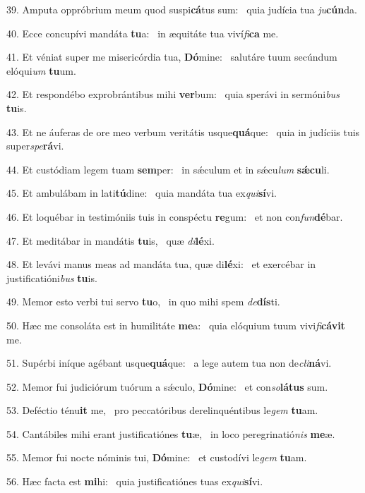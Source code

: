 39. Amputa oppróbrium meum quod suspi\textbf{cá}tus sum: \ast\  quia judícia tua \textit{ju}\textbf{cún}da.\

40. Ecce concupívi mandáta \textbf{tu}a: \ast\  in æquitáte tua viví\textit{fi}\textbf{ca} me.\

41. Et véniat super me misericórdia tua, \textbf{Dó}mine: \ast\  salutáre tuum secúndum elóqui\textit{um} \textbf{tu}um.\

42. Et respondébo exprobrántibus mihi \textbf{ver}bum: \ast\  quia sperávi in sermóni\textit{bus} \textbf{tu}is.\

43. Et ne áuferas de ore meo verbum veritátis usque\textbf{quá}que: \ast\  quia in judíciis tuis super\textit{spe}\textbf{rá}vi.\

44. Et custódiam legem tuam \textbf{sem}per: \ast\  in sǽculum et in sǽcu\textit{lum} \textbf{sǽ}\textbf{cu}li.\

45. Et ambulábam in lati\textbf{tú}dine: \ast\  quia mandáta tua ex\textit{qui}\textbf{sí}vi.\

46. Et loquébar in testimóniis tuis in conspéctu \textbf{re}gum: \ast\  et non con\textit{fun}\textbf{dé}bar.\

47. Et meditábar in mandátis \textbf{tu}is, \ast\  quæ \textit{di}\textbf{lé}xi.\

48. Et levávi manus meas ad mandáta tua, quæ di\textbf{lé}xi: \ast\  et exercébar in justificatióni\textit{bus} \textbf{tu}is.\

49. Memor esto verbi tui servo \textbf{tu}o, \ast\  in quo mihi spem \textit{de}\textbf{dís}ti.\

50. Hæc me consoláta est in humilitáte \textbf{me}a: \ast\  quia elóquium tuum vivi\textit{fi}\textbf{cá}\textbf{vit} me.\

51. Supérbi iníque agébant usque\textbf{quá}que: \ast\  a lege autem tua non de\textit{cli}\textbf{ná}vi.\

52. Memor fui judiciórum tuórum a sǽculo, \textbf{Dó}mine: \ast\  et con\textit{so}\textbf{lá}\textbf{tus} sum.\

53. Deféctio ténu\textbf{it} me, \ast\  pro peccatóribus derelinquéntibus le\textit{gem} \textbf{tu}am.\

54. Cantábiles mihi erant justificatiónes \textbf{tu}æ, \ast\  in loco peregrinatió\textit{nis} \textbf{me}æ.\

55. Memor fui nocte nóminis tui, \textbf{Dó}mine: \ast\  et custodívi le\textit{gem} \textbf{tu}am.\

56. Hæc facta est \textbf{mi}hi: \ast\  quia justificatiónes tuas ex\textit{qui}\textbf{sí}vi.\


